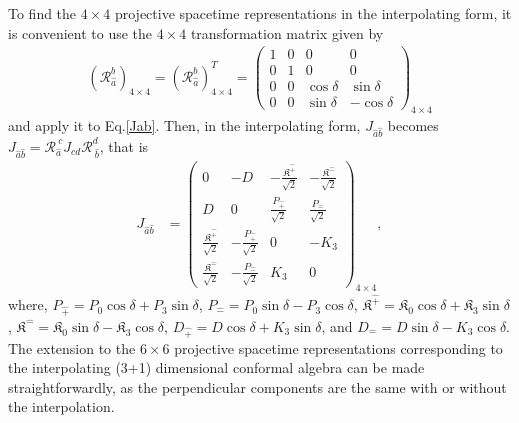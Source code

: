 \documentclass[%
 reprint,
superscriptaddress,
 amsmath,amssymb,
 aps,
]{revtex4-2}
\begin{document}
 To find the $4\times4$ projective spacetime representations in the interpolating form, it is convenient to use the 
 $4\times4$ transformation matrix given by
\begin{align}
    (\mathcal{R}_{\hat{a}}^{b})_{4\times4}=(\mathcal{R}_{\hat{a}}^{b})^T_{4\times4}=\begin{pmatrix}
    1&0&0&0\\
    0&1&0&0\\
    0&0&\cos{\delta}&\sin{\delta}\\
    0&0&\sin{\delta}&-\cos{\delta}
    \end{pmatrix}_{4\times4}
\end{align}
and apply it to Eq.\eqref{Jab}. 
Then, in the interpolating form, $J_{\hat{a}\hat{b}}$ becomes $J_{\hat{a}\hat{b}}=\mathcal{R}_{\hat{a}}^{~{c}}J_{cd}\mathcal{R}_{~\hat{b}}^{{d}}$, that is
\begin{align}
    J_{\hat{a}\hat{b}}&=\begin{pmatrix}
    0&-D&-\frac{\mathfrak{K}^{\hat{+}}}{\sqrt{2}}&-\frac{\mathfrak{K}^{\hat{-}}}{\sqrt{2}}\\
    D&0&\frac{P_{\hat{+}}}{\sqrt{2}}&\frac{P_{\hat{-}}}{\sqrt{2}}\\
    \frac{\mathfrak{K}^{\hat{+}}}{\sqrt{2}}&-\frac{P_{\hat{+}}}{\sqrt{2}}&0  & -{K}_{3}\\
    \frac{\mathfrak{K}^{\hat{-}}}{\sqrt{2}}&-\frac{P_{\hat{-}}}{\sqrt{2}}&{K}_{3}  & 0
  \end{pmatrix}_{4\times4}\label{Jhat+hat-},
\end{align}
where, $P_{\hat{+}}=P_0\cos{\delta}+P_3\sin{\delta}$, $P_{\hat{-}}=P_0\sin{\delta}-P_3\cos{\delta}$, $
\mathfrak{K}^{\hat{+}}=\mathfrak{K}_0\cos{\delta}+\mathfrak{K}_3\sin{\delta}$, $\mathfrak{K}^{\hat{-}}=\mathfrak{K}_0\sin{\delta}-\mathfrak{K}_3\cos{\delta}$, $D_{\hat{+}}=D\cos\delta+K_{3}\sin\delta$, 
and $D_{\hat{-}}=D\sin\delta-K_{3}\cos\delta$. The extension to the $6 \times 6$ projective spacetime representations corresponding to the interpolating (3+1) dimensional conformal algebra can be made straightforwardly, as the perpendicular components are the same with or without the interpolation.
\end{document}
